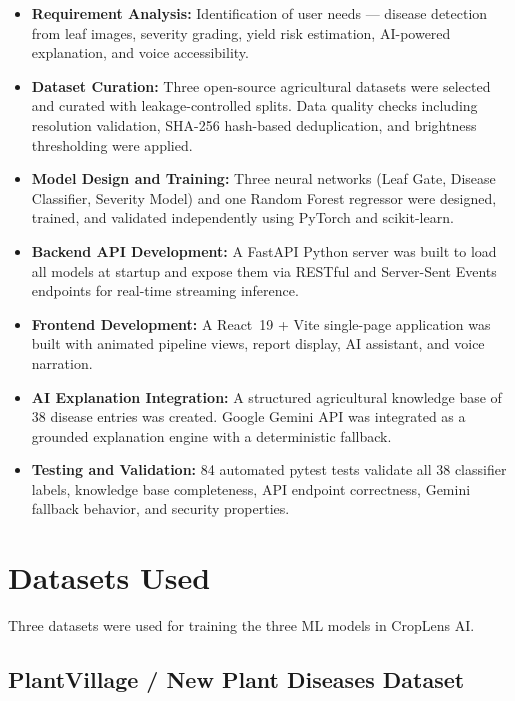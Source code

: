 \begin{itemize}
    \item \textbf{Requirement Analysis:} Identification of user needs --- disease detection from leaf images, severity grading, yield risk estimation, AI-powered explanation, and voice accessibility.

    \item \textbf{Dataset Curation:} Three open-source agricultural datasets were selected and curated with leakage-controlled splits. Data quality checks including resolution validation, SHA-256 hash-based deduplication, and brightness thresholding were applied.

    \item \textbf{Model Design and Training:} Three neural networks (Leaf Gate, Disease Classifier, Severity Model) and one Random Forest regressor were designed, trained, and validated independently using PyTorch and scikit-learn.

    \item \textbf{Backend API Development:} A FastAPI Python server was built to load all models at startup and expose them via RESTful and Server-Sent Events endpoints for real-time streaming inference.

    \item \textbf{Frontend Development:} A React~19 + Vite single-page application was built with animated pipeline views, report display, AI assistant, and voice narration.

    \item \textbf{AI Explanation Integration:} A structured agricultural knowledge base of 38 disease entries was created. Google Gemini API was integrated as a grounded explanation engine with a deterministic fallback.

    \item \textbf{Testing and Validation:} 84 automated pytest tests validate all 38 classifier labels, knowledge base completeness, API endpoint correctness, Gemini fallback behavior, and security properties.
\end{itemize}

\section{Datasets Used}

Three datasets were used for training the three ML models in CropLens AI.

\subsection{PlantVillage / New Plant Diseases Dataset}

